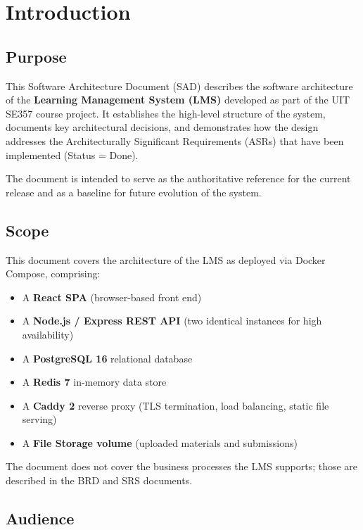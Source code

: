 \documentclass[12pt,a4paper]{article}
\begin{document}
\section{Introduction}

\subsection{Purpose}

This Software Architecture Document (SAD) describes the software architecture of the \textbf{Learning Management System (LMS)} developed as part of the UIT SE357 course project. It establishes the high-level structure of the system, documents key architectural decisions, and demonstrates how the design addresses the Architecturally Significant Requirements (ASRs) that have been implemented (Status = Done).

The document is intended to serve as the authoritative reference for the current release and as a baseline for future evolution of the system.

\subsection{Scope}

This document covers the architecture of the LMS as deployed via Docker Compose, comprising:

\begin{itemize}[noitemsep]
  \item A \textbf{React SPA} (browser-based front end)
  \item A \textbf{Node.js / Express REST API} (two identical instances for high availability)
  \item A \textbf{PostgreSQL 16} relational database
  \item A \textbf{Redis 7} in-memory data store
  \item A \textbf{Caddy 2} reverse proxy (TLS termination, load balancing, static file serving)
  \item A \textbf{File Storage volume} (uploaded materials and submissions)
\end{itemize}

The document does not cover the business processes the LMS supports; those are described in the BRD and SRS documents.

\subsection{Audience}
\end{document}
